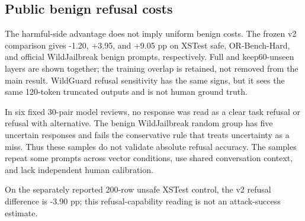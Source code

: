 \subsection{Public benign refusal costs}

The harmful-side advantage does not imply uniform benign costs. The frozen v2 comparison gives -1.20, +3.95, and +9.05 pp on XSTest safe, OR-Bench-Hard, and official WildJailbreak benign prompts, respectively. Full and keep60-unseen layers are shown together; the training overlap is retained, not removed from the main result. WildGuard refusal sensitivity has the same signs, but it sees the same 120-token truncated outputs and is not human ground truth.

In six fixed 30-pair model reviews, no response was read as a clear task refusal or refusal with alternative. The benign WildJailbreak random group has five uncertain responses and fails the conservative rule that treats uncertainty as a miss. Thus these samples do not validate absolute refusal accuracy. The samples repeat some prompts across vector conditions, use shared conversation context, and lack independent human calibration.

On the separately reported 200-row unsafe XSTest control, the v2 refusal difference is -3.90 pp; this refusal-capability reading is not an attack-success estimate.


